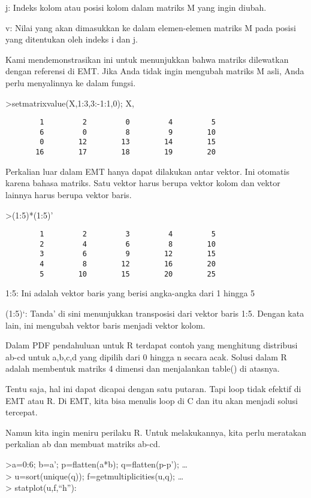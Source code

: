 \documentclass[
]{book}
\begin{document}
j: Indeks kolom atau posisi kolom dalam matriks M yang ingin diubah.

v: Nilai yang akan dimasukkan ke dalam elemen-elemen matriks M pada posisi yang ditentukan oleh indeks i dan j.

Kami mendemonstrasikan ini untuk menunjukkan bahwa matriks dilewatkan dengan referensi di EMT. Jika Anda tidak ingin mengubah matriks M asli, Anda perlu menyalinnya ke dalam fungsi.

\textgreater setmatrixvalue(X,1:3,3:-1:1,0); X,

\begin{verbatim}
        1         2         0         4         5 
        6         0         8         9        10 
        0        12        13        14        15 
       16        17        18        19        20 
\end{verbatim}

Perkalian luar dalam EMT hanya dapat dilakukan antar vektor. Ini otomatis karena bahasa matriks. Satu vektor harus berupa vektor kolom dan vektor lainnya harus berupa vektor baris.

\textgreater(1:5)*(1:5)'

\begin{verbatim}
        1         2         3         4         5 
        2         4         6         8        10 
        3         6         9        12        15 
        4         8        12        16        20 
        5        10        15        20        25 
\end{verbatim}

1:5: Ini adalah vektor baris yang berisi angka-angka dari 1 hingga 5

(1:5)`: Tanda' di sini menunjukkan transposisi dari vektor baris 1:5. Dengan kata lain, ini mengubah vektor baris menjadi vektor kolom.

Dalam PDF pendahuluan untuk R terdapat contoh yang menghitung distribusi ab-cd untuk a,b,c,d yang dipilih dari 0 hingga n secara acak. Solusi dalam R adalah membentuk matriks 4 dimensi dan menjalankan table() di atasnya.

Tentu saja, hal ini dapat dicapai dengan satu putaran. Tapi loop tidak efektif di EMT atau R. Di EMT, kita bisa menulis loop di C dan itu akan menjadi solusi tercepat.

Namun kita ingin meniru perilaku R. Untuk melakukannya, kita perlu meratakan perkalian ab dan membuat matriks ab-cd.

\textgreater a=0:6; b=a'; p=flatten(a*b); q=flatten(p-p'); \ldots{}\\
\textgreater{} u=sort(unique(q)); f=getmultiplicities(u,q); \ldots{}\\
\textgreater{} statplot(u,f,``h''):
\end{document}
